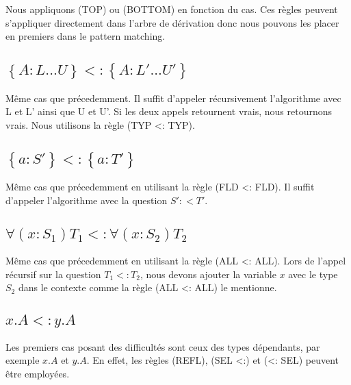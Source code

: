 Nous appliquons (TOP) ou (BOTTOM) en fonction du cas. Ces règles peuvent
s'appliquer directement dans l'arbre de dérivation donc nous pouvons les placer
en premiers dans le pattern matching.

\subsection*{$\left\{ A : L ... U \right\} <: \left\{ A : L' ... U' \right\}$}

Même cas que précedemment. Il suffit d'appeler récursivement l'algorithme avec L
et L' ainsi que U et U'. Si les deux appels retournent vrais, nous retournons
vrais. Nous utilisons la règle (TYP <: TYP).

\subsection*{$\left\{ a : S' \right\} <: \left\{ a : T' \right\}$}

Même cas que précedemment en utilisant la règle (FLD <: FLD). Il suffit
d'appeler l'algorithme avec la question $S' :< T'$.

\subsection*{$\forall(x : S_{1}) T_{1} <: \forall(x : S_{2}) T_{2}$}

Même cas que précedemment en utilisant la règle (ALL <: ALL). Lors de l'appel
récursif sur la question $T_{1} <: T_{2}$, nous devons ajouter la variable $x$
avec le type $S_{2}$ dans le contexte comme la règle (ALL <: ALL) le mentionne.

\subsection*{$x.A <: y.A$}

Les premiers cas posant des difficultés sont ceux des types dépendants, par exemple
$x.A$ et $y.A$. En effet, les règles (REFL), (SEL <:) et (<: SEL) peuvent être
employées.


